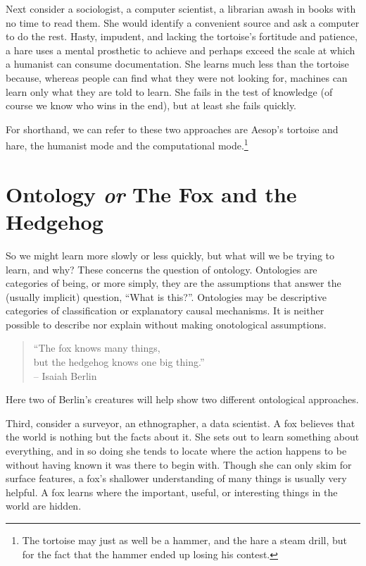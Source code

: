\documentclass[]{book}
\let\rmarkdownfootnote\footnote%
\def\footnote{\protect\rmarkdownfootnote}
\begin{document}
Next consider a sociologist, a computer scientist, a librarian awash in
books with no time to read them. She would identify a convenient source
and ask a computer to do the rest. Hasty, impudent, and lacking the
tortoise's fortitude and patience, a hare uses a mental prosthetic to
achieve and perhaps exceed the scale at which a humanist can consume
documentation. She learns much less than the tortoise because, whereas
people can find what they were not looking for, machines can learn only
what they are told to learn. She fails in the test of knowledge (of
course we know who wins in the end), but at least she fails quickly.

For shorthand, we can refer to these two approaches are Aesop's tortoise
and hare, the humanist mode and the computational mode.\footnote{The
  tortoise may just as well be a hammer, and the hare a steam drill, but
  for the fact that the hammer ended up losing his contest.}

\section{\texorpdfstring{Ontology \emph{or} The Fox and the
Hedgehog}{Ontology or The Fox and the Hedgehog}}\label{ontology-or-the-fox-and-the-hedgehog}

So we might learn more slowly or less quickly, but what will we be
trying to learn, and why? These concerns the question of ontology.
Ontologies are categories of being, or more simply, they are the
assumptions that answer the (usually implicit) question, ``What is
this?''. Ontologies may be descriptive categories of classification or
explanatory causal mechanisms. It is neither possible to describe nor
explain without making onotological assumptions.

\begin{quote}
``The fox knows many things,\\
but the hedgehog knows one big thing.''\\
-- Isaiah Berlin\citeyearpar[1]{Berlin1953Hedgehog}
\end{quote}

Here two of Berlin's creatures will help show two different ontological
approaches.

Third, consider a surveyor, an ethnographer, a data scientist. A fox
believes that the world is nothing but the facts about it. She sets out
to learn something about everything, and in so doing she tends to locate
where the action happens to be without having known it was there to
begin with. Though she can only skim for surface features, a fox's
shallower understanding of many things is usually very helpful. A fox
learns where the important, useful, or interesting things in the world
are hidden.
\end{document}
